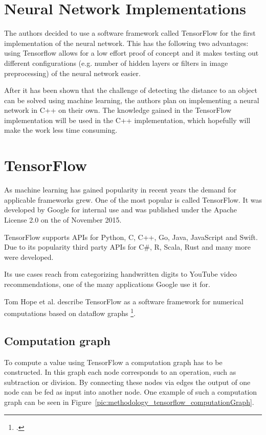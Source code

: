 \section{Neural Network Implementations}
The authors decided to use a software framework called TensorFlow for the first implementation of the neural network. This has the following two advantages: using Tensorflow allows for a low effort proof of concept and it makes testing out different configurations (e.g. number of hidden layers or filters in image preprocessing) of the neural network easier.

After it has been shown that the challenge of detecting the distance to an object can be solved using machine learning, the authors plan on implementing a neural network in C++ on their own. The knowledge gained in the TensorFlow implementation will be used in the C++ implementation, which hopefully will make the work less time consuming.

\section{TensorFlow}
As machine learning has gained popularity in recent years the demand for applicable frameworks grew. One of the most popular is called TensorFlow. It was developed by Google for internal use and was published under the Apache License 2.0 on the  of November 2015.

TensorFlow supports APIs for Python, C, C++, Go, Java, JavaScript and Swift.
Due to its popularity third party APIs for C\#, R, Scala, Rust and many more were developed.

Its use cases reach from categorizing handwritten digits to YouTube video recommendations, one of the many applications Google use it for.

Tom Hope et al. describe TensorFlow as a software framework for numerical computations based on dataflow graphs \footcite[page 6]{Hope_Learning_TensorFlow}.

\subsection{Computation graph}
To compute a value using TensorFlow a computation graph has to be constructed. In this graph each node corresponds to an operation, such as subtraction or division. By connecting these nodes via edges the output of one node can be fed as input into another node. One example of such a computation graph can be seen in Figure~\ref{pic:methodology_tensorflow_computationGraph}.

